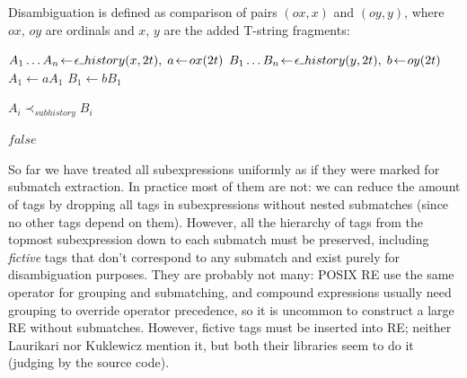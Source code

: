 \documentclass{article}
\newcommand{\Xset}{\!\leftarrow\!}
\newcommand{\Xund}{\rule{.4em}{.4pt}} %
\newcommand{\Xeq}{\!=\!}
\theoremstyle{definition}
\begin{document}
\begin{multicols}{2}
Disambiguation is defined as comparison of pairs $(ox, x)$ and $(oy, y)$,
where $ox$, $oy$ are ordinals and $x$, $y$ are the added T-string fragments:
\\

    \begin{algorithm}[H] \DontPrintSemicolon {} 
     {
        \For {$t \Xeq \overline{1, N}$} {
            $A_1 \dots A_n \Xset \epsilon \Xund history(x, 2t), \; a \Xset ox(2t)$ \;
            $B_1 \dots B_n \Xset \epsilon \Xund history(y, 2t), \; b \Xset oy(2t)$ \;
            $A_1 \Xset a A_1$ \;
            $B_1 \Xset b B_1$ \;


            \For {$i \Xeq \overline{1, n}$} {
                 {\Return $A_i \prec_{subhistory} B_i$}
            }
        }
        \Return $false$ \;
    }
    \end{algorithm}

So far we have treated all subexpressions uniformly as if they were marked for submatch extraction.
In practice most of them are not: we can reduce the amount of tags by dropping all tags in subexpressions without nested submatches
(since no other tags depend on them).
However, all the hierarchy of tags from the topmost subexpression down to each submatch must be preserved,
including \emph{fictive} tags that don't correspond to any submatch and exist purely for disambiguation purposes.
They are probably not many: POSIX RE use the same operator for grouping and submatching,
and compound expressions usually need grouping to override operator precedence,
so it is uncommon to construct a large RE without submatches.
However, fictive tags must be inserted into RE; neither Laurikari nor Kuklewicz mention it,
but both their libraries seem to do it (judging by the source code).
\\


\end{multicols}
\end{document}
